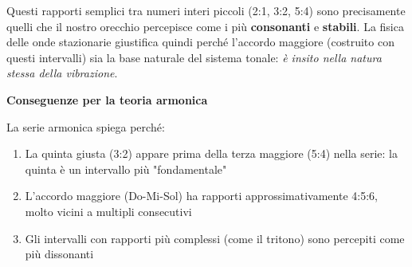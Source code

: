 \begin{fisica}
	Questi rapporti semplici tra numeri interi piccoli (2:1, 3:2, 5:4) sono precisamente quelli che il nostro orecchio percepisce come i più \textbf{consonanti} e \textbf{stabili}. La fisica delle onde stazionarie giustifica quindi perché l'accordo maggiore (costruito con questi intervalli) sia la base naturale del sistema tonale: \textit{è insito nella natura stessa della vibrazione}.
	
	\textbf{Conseguenze per la teoria armonica}
	
	La serie armonica spiega perché:
	\begin{enumerate}
		\item La quinta giusta (3:2) appare prima della terza maggiore (5:4) nella serie: la quinta è un intervallo più "fondamentale"
		\item L'accordo maggiore (Do-Mi-Sol) ha rapporti approssimativamente 4:5:6, molto vicini a multipli consecutivi
		\item Gli intervalli con rapporti più complessi (come il tritono) sono percepiti come più dissonanti
	\end{enumerate}
\end{fisica}

